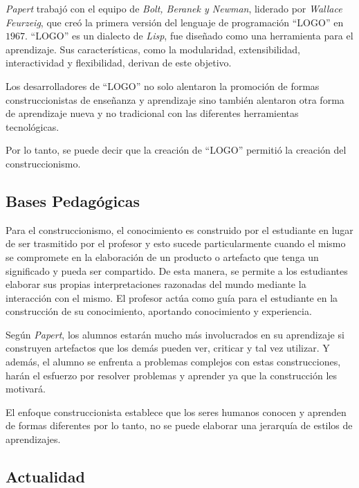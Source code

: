 \textit{Papert} trabajó con el equipo de \textit{Bolt, Beranek y Newman},
liderado por \textit{Wallace Feurzeig}, que creó la primera versión del lenguaje
de programación \enquote{LOGO} en $1967$. \enquote{LOGO} es un dialecto de
\textit{Lisp}, fue diseñado como una herramienta para el aprendizaje. Sus
características, como la modularidad, extensibilidad, interactividad y
flexibilidad, derivan de este objetivo\cite{logo:sg}.

Los desarrolladores de \enquote{LOGO} no solo alentaron la promoción de formas
construccionistas de enseñanza y aprendizaje sino también alentaron otra forma
de aprendizaje nueva y no tradicional con las diferentes herramientas
tecnológicas\cite{historia:2014}. 

Por lo tanto, se puede decir que la creación de \enquote{LOGO} permitió la
creación del construccionismo\cite{historia:2014}.

\subsection{Bases Pedagógicas}

Para el construccionismo, el conocimiento es construido por el estudiante en
lugar de ser trasmitido por el profesor\cite{moses:2003} y esto sucede
particularmente cuando el mismo se compromete en la elaboración de un producto o
artefacto que tenga un significado y pueda ser compartido\cite{valdivia:sg}. De
esta manera, se permite a los estudiantes elaborar sus propias interpretaciones
razonadas del mundo mediante la interacción con el mismo. El profesor actúa como
guía para el estudiante en la construcción de su conocimiento, aportando
conocimiento y experiencia.

Según \textit{Papert}, los alumnos estarán mucho más involucrados en su aprendizaje si
construyen artefactos que los demás pueden ver, criticar y tal vez utilizar. Y
además, el alumno se enfrenta a problemas complejos con estas construcciones,
harán el esfuerzo por resolver problemas y aprender ya que la construcción les
motivará\cite{const:vs}.

El enfoque construccionista establece que los seres humanos conocen y aprenden
de formas diferentes por lo tanto, no se puede elaborar una jerarquía de estilos
de aprendizajes\cite{valdivia:sg}.

\subsection{Actualidad}

